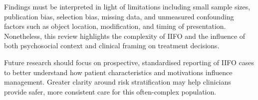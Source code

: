 Findings must be interpreted in light of limitations including small sample sizes, publication bias, selection bias, missing data, and unmeasured confounding factors such as object location, modification, and timing of presentation. Nonetheless, this review highlights the complexity of IIFO and the influence of both psychosocial context and clinical framing on treatment decisions.

Future research should focus on prospective, standardised reporting of IIFO cases to better understand how patient characteristics and motivations influence management. Greater clarity around risk stratification may help clinicians provide safer, more consistent care for this often-complex population.